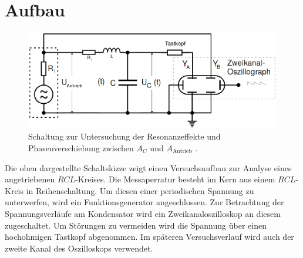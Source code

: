 \section{Aufbau}
\label{sec:Aufbau}

\begin{figure}[H]
         \centering
         \includegraphics[width=\linewidth-150pt,height=\textheight-150pt,keepaspectratio]{content/Aufgabec.png}
         \caption{Schaltung zur Untersuchung der Resonanzeffekte und Phasenverschiebung zwischen $A_C$ und $A_{\text{Antrieb}}$ \cite{V354}.}
         \label{fig:Schalplanc}
       \end{figure}
 Die oben dargestellte Schaltskizze zeigt einen Versuchsaufbau zur Analyse eines
 angetriebenen $RCL$-Kreises. Die Messaperratur besteht im Kern aus einem
  $RCL$-Kreis in Reihenschaltung. Um diesen einer periodischen Spannung zu unterwerfen, wird ein
   Funktionsgenerator angeschlossen. Zur Betrachtung der Spannungsverläufe am
    Kondensator wird ein Zweikanaloszilloskop an diesem zugeschaltet. Um
     Störungen zu vermeiden wird die Spannung über einen hochohmigen Tastkopf abgenommen.
      Im späteren Versuchsverlauf wird auch der zweite Kanal des Oszilloskops verwendet.
